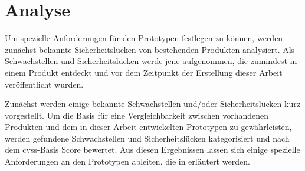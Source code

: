 \section{Analyse}
\label{sec:analysis}
	Um spezielle Anforderungen für den Prototypen festlegen zu können, werden zunächst bekannte Sicherheitslücken von bestehenden Produkten analysiert. 
	Als Schwachstellen und Sicherheitslücken werde jene aufgenommen, die zumindest in einem Produkt entdeckt und vor dem Zeitpunkt der Erstellung dieser Arbeit veröffentlicht wurden.
	
	Zunächst werden einige bekannte Schwachstellen und/oder Sicherheitslücken kurz vorgestellt.
	Um die Basis für eine Vergleichbarkeit zwischen vorhandenen Produkten und dem in dieser Arbeit entwickelten Prototypen zu gewährleisten, werden gefundene Schwachstellen und Sicherheitslücken kategorisiert und nach dem \gls{cvss}-Basis Score bewertet.
	Aus diesen Ergebnissen lassen sich einige spezielle Anforderungen an den Prototypen ableiten, die in  erläutert werden.
